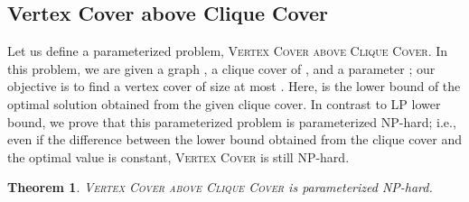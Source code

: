 \documentclass[11pt]{article}
\newtheorem{theorem}{Theorem}
\begin{document}
\subsection{Vertex Cover above Clique Cover}
Let us define a parameterized problem, \textsc{Vertex Cover above Clique Cover}.
In this problem, we are given a graph , a clique cover  of , and a parameter ;
our objective is to find a vertex cover of size at most .
Here,  is the lower bound of the optimal solution obtained from the given clique
cover.
In contrast to LP lower bound,
we prove that this parameterized problem is parameterized NP-hard; i.e., even if the difference between the lower
bound obtained from the clique cover and the optimal value is constant, \textsc{Vertex Cover} is still NP-hard.
\begin{theorem}\label{thm:above_clique}
\textsc{Vertex Cover above Clique Cover} is parameterized NP-hard.
\end{theorem}
\end{document}
